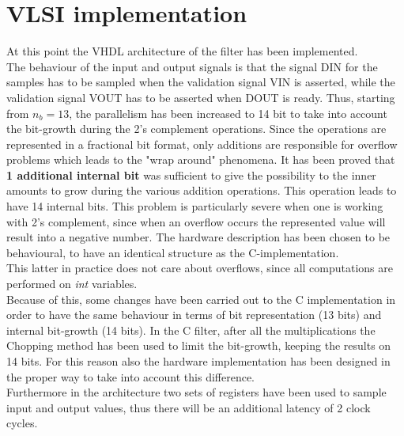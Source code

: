 \documentclass[a4paper, titlepage]{article}
\begin{document}
\section{VLSI implementation}
\noindent
At this point the VHDL architecture of the filter has been implemented.\\The behaviour of the input and output signals is that the signal DIN for the samples has to be sampled when the validation signal VIN is asserted, while the validation signal VOUT has to be asserted when DOUT is ready.
\newline
Thus, starting from $n_{b}=13$, the parallelism has been increased to 14 bit to take into account the bit-growth during the 2's complement operations. Since the operations are represented in a fractional bit format, only additions are responsible for overflow problems which leads to the "wrap around" phenomena.
\newline
It has been proved that \textbf{1 additional internal bit} was sufficient to give the possibility to the inner amounts to grow during the various addition operations. This operation leads to have 14 internal bits.
\newline
This problem is particularly severe when one is working with 2's complement, since when an overflow occurs the represented value will result into a negative number. 
\newline
The hardware description has been chosen to be behavioural, to have an identical structure as the C-implementation.\\
This latter in practice does not care about overflows, since all computations are performed on \textit{int} variables. 
\\ %
Because of this, some changes have been carried out to the C implementation in order to have the same behaviour in terms of bit representation (13 bits) and internal bit-growth (14 bits).
In the C filter, after all the multiplications the Chopping method has been used to limit the bit-growth, keeping the results on 14 bits. For this reason also the hardware implementation has been designed in the proper way to take into account this difference. 
\\Furthermore in the architecture two sets of registers have been used to sample input and output values, thus there will be an additional latency of 2 clock cycles.
\end{document}
